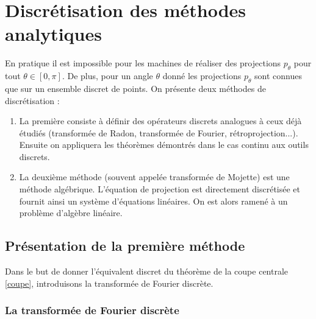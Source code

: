 \documentclass{article}
\theoremstyle{definition}
\theoremstyle{remark}
\theoremstyle{plain}
\theoremstyle{definition}
\begin{document}
\section{Discrétisation des méthodes analytiques}
En pratique il est impossible pour les machines de réaliser des projections $p_{\theta}$ pour tout $\theta \in [0,\pi]$.
De plus, pour un angle $\theta$ donné les projections $p_{\theta}$ sont connues que sur un ensemble discret de points.
On présente deux méthodes de discrétisation : 
\begin{enumerate}
    \item La première consiste à définir des opérateurs discrets analogues à ceux déjà étudiés (transformée de Radon, transformée de Fourier, rétroprojection...). Ensuite on appliquera les théorèmes démontrés 
    dans le cas continu aux outils discrets. 
    \item La deuxième méthode (souvent appelée transformée de Mojette) est une méthode algébrique. L'équation de projection est directement discrétisée et fournit ainsi un système d'équations linéaires. On est alors ramené 
    à un problème d'algèbre linéaire. 
\end{enumerate}
\subsection{Présentation de la première méthode}

Dans le but de donner l'équivalent discret du théorème de la coupe centrale \ref{coupe}, introduisons la transformée de Fourier discrète. 
\subsubsection{La transformée de Fourier discrète}
\end{document}

